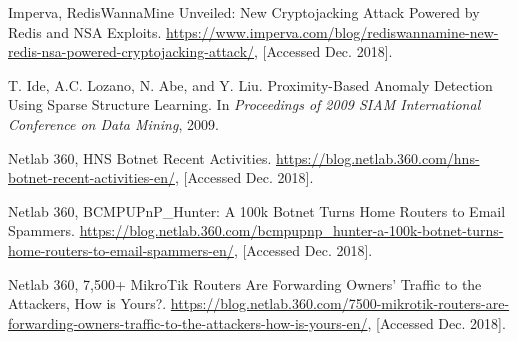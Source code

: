 \documentclass[conference]{IEEEtran}
\begin{document}
\begin{thebibliography}{99}
Imperva, RedisWannaMine Unveiled: New Cryptojacking Attack Powered by Redis and NSA Exploits. \url{https://www.imperva.com/blog/rediswannamine-new-redis-nsa-powered-cryptojacking-attack/}, [Accessed Dec. 2018].

T. Ide, A.C. Lozano, N. Abe, and Y. Liu. Proximity-Based Anomaly Detection Using Sparse Structure Learning. In {\it Proceedings of 2009 SIAM International Conference on Data Mining}, 2009.

Netlab 360, HNS Botnet Recent Activities. \url{https://blog.netlab.360.com/hns-botnet-recent-activities-en/}, [Accessed Dec. 2018].

Netlab 360, BCMPUPnP\_Hunter: A 100k Botnet Turns Home Routers to Email Spammers. \url{https://blog.netlab.360.com/bcmpupnp_hunter-a-100k-botnet-turns-home-routers-to-email-spammers-en/}, [Accessed Dec. 2018].

Netlab 360, 7,500+ MikroTik Routers Are Forwarding Owners’ Traffic to the Attackers, How is Yours?. \url{https://blog.netlab.360.com/7500-mikrotik-routers-are-forwarding-owners-traffic-to-the-attackers-how-is-yours-en/}, [Accessed Dec. 2018].


\end{thebibliography}
\end{document}
